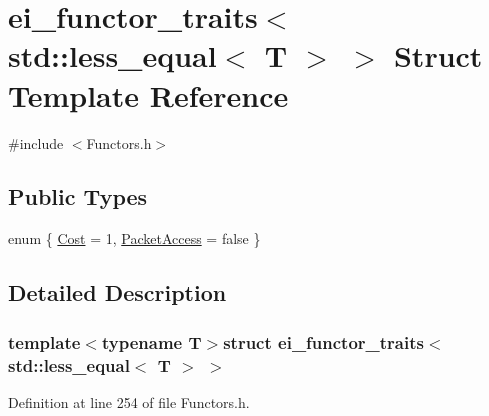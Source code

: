 \hypertarget{structei__functor__traits_3_01std_1_1less__equal_3_01_t_01_4_01_4}{\section{ei\-\_\-functor\-\_\-traits$<$ std\-:\-:less\-\_\-equal$<$ T $>$ $>$ Struct Template Reference}
\label{structei__functor__traits_3_01std_1_1less__equal_3_01_t_01_4_01_4}
}


{\ttfamily \#include $<$Functors.\-h$>$}

\subsection*{Public Types}
\begin{DoxyCompactItemize}
\item 
enum \{ \hyperlink{structei__functor__traits_3_01std_1_1less__equal_3_01_t_01_4_01_4_a3c8633db0243f0c43a549ab0c567974aa26ae3918fb10fdd3fa7419053d191430}{Cost} = 1, 
\hyperlink{structei__functor__traits_3_01std_1_1less__equal_3_01_t_01_4_01_4_a3c8633db0243f0c43a549ab0c567974aa0fda92d45ae1538ea2cf87cd9c849b3e}{Packet\-Access} = false
 \}
\end{DoxyCompactItemize}


\subsection{Detailed Description}
\subsubsection*{template$<$typename T$>$struct ei\-\_\-functor\-\_\-traits$<$ std\-::less\-\_\-equal$<$ T $>$ $>$}



Definition at line 254 of file Functors.\-h.



